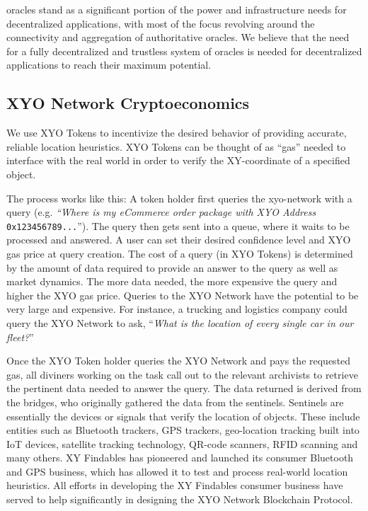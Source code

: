 \documentclass{article}
\begin{document}
\Glspl{oracle} stand as a significant portion of the power and infrastructure needs for decentralized applications, with most of the focus revolving around the connectivity and aggregation of authoritative oracles. We believe that the need for a fully decentralized and \gls{trustless} system of oracles is needed for decentralized applications to reach their maximum potential.


\subsection {XYO Network Cryptoeconomics}
We use XYO Tokens to incentivize the desired behavior of providing accurate, reliable location \glspl{heuristic}. XYO Tokens can be thought of as ``gas'' needed to interface with the real world in order to verify the XY-coordinate of a specified object.

The process works like this: A token holder first queries the \Gls{xyo-network} with a query (e.g. \textit{``Where is my eCommerce order package with XYO Address} \texttt{0x123456789...}''). The query then gets sent into a queue, where it waits to be processed and answered. A user can set their desired confidence level and XYO gas price at query creation. The cost of a query (in XYO Tokens) is determined by the amount of data required to provide an answer to the query as well as market dynamics.  The more data needed, the more expensive the query and higher the XYO gas price. Queries to the XYO Network have the potential to be very large and expensive. For instance, a trucking and logistics company could query the XYO Network to ask, ``\textit{What is the location of every single car in our fleet?}''

Once the XYO Token holder queries the XYO Network and pays the requested gas, all \Glspl{diviner} working on the task call out to the relevant \Glspl{archivist} to retrieve the pertinent data needed to answer the query. The data returned is derived from the \Glspl{bridge}, who originally gathered the data from the \Glspl{sentinel}. Sentinels are essentially the devices or signals that verify the location of objects. These include entities such as Bluetooth trackers, GPS trackers, geo-location tracking built into IoT devices, satellite tracking technology, QR-code scanners, RFID scanning and many others. XY Findables has pioneered and launched its consumer Bluetooth and GPS business, which has allowed it to test and process real-world location \glspl{heuristic}. All efforts in developing the XY Findables consumer business have served to help significantly in designing the XYO Network Blockchain Protocol.
\end{document}
